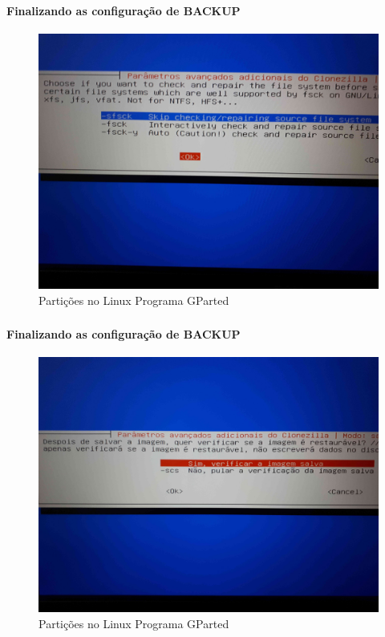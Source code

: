 \documentclass{beamer}
\begin{document}
\begin{frame}[plain,c]
   \frametitle{\insertsection}
    \framesubtitle{Finalizando as configuração de BACKUP}
    \begin{figure}[!h]
        \includegraphics[width=1\linewidth]{images/backup/bkp20.jpg}
        \caption{Partições no Linux Programa GParted}
    \end{figure}
\end{frame}	
\begin{frame}[plain,c]
   \frametitle{\insertsection}
    \framesubtitle{Finalizando as configuração de BACKUP}
    \begin{figure}[!h]
        \includegraphics[width=1\linewidth]{images/backup/bkp21.jpg}
        \caption{Partições no Linux Programa GParted}
    \end{figure}
\end{frame}	
\end{document}
